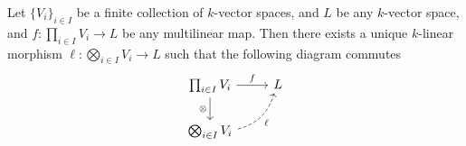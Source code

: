 \begin{theorem}
  \label{thm: universal property of tensor products}
  Let \(\{V_i\}_{i \in I}\) be a finite collection of \(k\)-vector spaces, and
  \(L\) be any \(k\)-vector space, and \(f: \prod_{i \in I} V_i \to L\) be any
  multilinear map. Then there exists a unique \(k\)-linear morphism \(\ell :
  \bigotimes_{i \in I} V_i \to L\) such that the following diagram commutes
  \[
    \begin{tikzcd}
      \prod_{i \in I} V_i
      \ar[r, "f"]
      \ar[d, swap, "\otimes"]
        &L \\
      \bigotimes_{i \in I} V_i
      \ar[ur, swap, bend right, dashed, "\ell"]
    \end{tikzcd}
  \]
\end{theorem}


